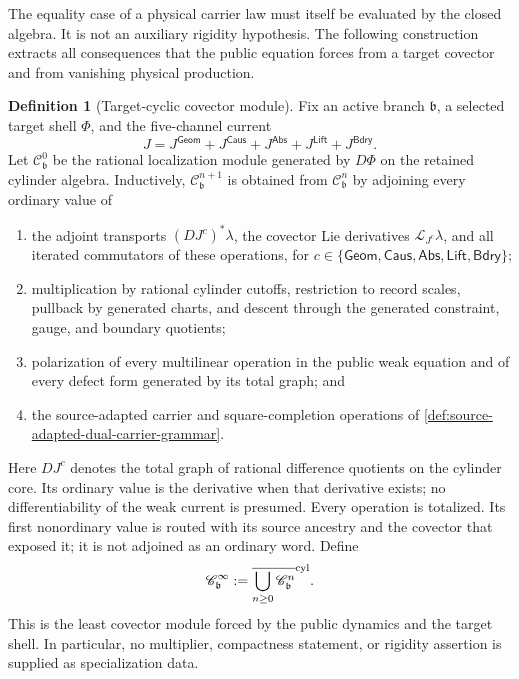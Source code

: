\documentclass[11pt]{article}
\numberwithin{section}{part}
\theoremstyle{plain}
\theoremstyle{definition}
\newtheorem{definition}[definition]{Definition}
\theoremstyle{remark}
\newcommand{\Geom}{\mathsf{Geom}}
\newcommand{\Caus}{\mathsf{Caus}}
\newcommand{\Abs}{\mathsf{Abs}}
\newcommand{\Lift}{\mathsf{Lift}}
\newcommand{\Bdry}{\mathsf{Bdry}}
\begin{document}
The equality case of a physical carrier law must itself be evaluated by the
closed algebra.  It is not an auxiliary rigidity hypothesis.  The following
construction extracts all consequences that the public equation forces from
a target covector and from vanishing physical production.

\begin{definition}[Target-cyclic covector module]
\label{def:target-cyclic-covector-module}
Fix an active branch \(\mathfrak b\), a selected target shell \(\Phi\), and
the five-channel current
\[
 J=J^{\Geom}+J^{\Caus}+J^{\Abs}+J^{\Lift}+J^{\Bdry}.
\]
Let \(\mathscr C^0_{\mathfrak b}\) be the rational localization module
generated by \(D\Phi\) on the retained cylinder algebra.  Inductively,
\(\mathscr C^{n+1}_{\mathfrak b}\) is obtained from
\(\mathscr C^n_{\mathfrak b}\) by adjoining every ordinary value of
\begin{enumerate}[label=\textup{(C\arabic*)}]
\item the adjoint transports \((DJ^c)^*\lambda\), the covector Lie
derivatives \(\mathcal L_{J^c}\lambda\), and all iterated commutators of
these operations, for \(c\in\{\Geom,\Caus,\Abs,\Lift,\Bdry\}\);
\item multiplication by rational cylinder cutoffs, restriction to record
scales, pullback by generated charts, and descent through the generated
constraint, gauge, and boundary quotients;
\item polarization of every multilinear operation in the public weak
equation and of every defect form generated by its total graph; and
\item the source-adapted carrier and square-completion operations of
\cref{def:source-adapted-dual-carrier-grammar}.
\end{enumerate}
Here \(DJ^c\) denotes the total graph of rational difference quotients on
the cylinder core.  Its ordinary value is the derivative when that derivative
exists; no differentiability of the weak current is presumed.
Every operation is totalized.  Its first nonordinary value is routed with its
source ancestry and the covector that exposed it; it is not adjoined as an
ordinary word.  Define
\begin{equation}
 \label{eq:target-cyclic-module}
 \mathscr C^\infty_{\mathfrak b}
 :=\overline{\bigcup_{n\geq0}\mathscr C^n_{\mathfrak b}}^{\rm cyl}.
\end{equation}
This is the least covector module forced by the public dynamics and the
target shell.  In particular, no multiplier, compactness statement, or
rigidity assertion is supplied as specialization data.
\end{definition}
\end{document}
